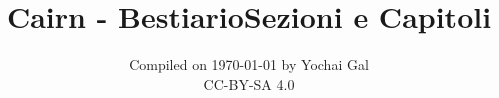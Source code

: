 \documentclass[
  10pt,
  american,
]{extbook}
\title{Cairn - Bestiario}
\subtitle{Compiled on {\today} by Yochai Gal \\ CC-BY-SA 4.0}
\date{}
\begin{document}
\begin{minipage}{\textwidth}
\AtBeginShipoutNext{\AtBeginShipoutDiscard}

\end{minipage}
\AtEndDocument{}
\maketitle
\thispagestyle{empty}
\AtBeginShipoutNext{\AtBeginShipoutDiscard}
\let\oldtoc\tableofcontents
\renewcommand{\contentsname}{\centering Creature dalla A alla Z}
\title{Sezioni e Capitoli}
\renewcommand{\tableofcontents}{\oldtoc\newpage}
{
\pagestyle{empty}
\begin{multicols}{2}
\tableofcontents
\end{multicols}
}
\clearpage
{} 
\setcounter{page}{5}
\shipout\null

\end{document}
